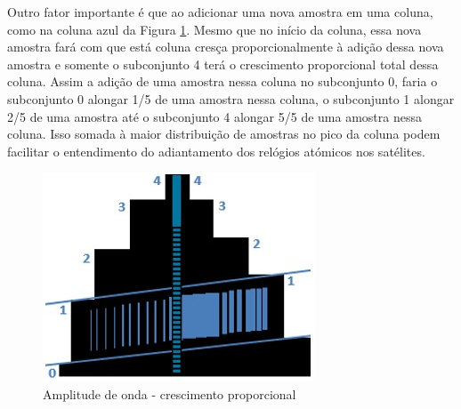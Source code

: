 Outro fator importante é que ao adicionar uma nova amostra em uma coluna, como na coluna azul da Figura \ref{fig:consciousness_space_amplitude_growth}. Mesmo que no início da coluna, essa nova amostra fará com que está coluna cresça proporcionalmente à adição dessa nova amostra e somente o subconjunto 4 terá o crescimento proporcional total dessa coluna. Assim a adição de uma amostra nessa coluna no subconjunto 0, faria o subconjunto 0 alongar 1/5 de uma amostra nessa coluna, o subconjunto 1 alongar 2/5 de uma amostra até o subconjunto 4 alongar 5/5 de uma amostra nessa coluna. Isso somada à maior distribuição de amostras no pico da coluna podem facilitar o entendimento do adiantamento dos relógios atómicos nos satélites.
	\begin{figure}[H]
	\caption{Amplitude de onda - crescimento proporcional}
	\label{fig:consciousness_space_amplitude_growth}
	\centering
	\includegraphics[scale=.7]{sections/images/consciousness_space_amplitude_growth.jpg}
	\end{figure}

